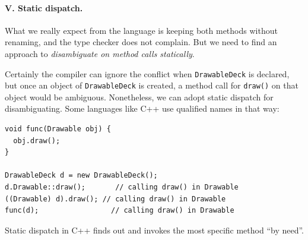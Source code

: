 \paragraph{V. Static dispatch.}
What we really expect from the language is keeping both methods
without renaming, and the type checker does not complain. 
But we need to find an approach to \emph{disambiguate on method
calls statically}.

Certainly the compiler can ignore the conflict when
\lstinline|DrawableDeck| is declared, but once an object of
\lstinline|DrawableDeck| is created, a method call for
\lstinline|draw()| on that object would be ambiguous. Nonetheless, we can adopt static dispatch for
disambiguating. Some languages like C++ use qualified names in that
way:

\vspace{3pt}\begin{lstlisting}
void func(Drawable obj) {
  obj.draw();
}

DrawableDeck d = new DrawableDeck();
d.Drawable::draw();       // calling draw() in Drawable
((Drawable) d).draw(); // calling draw() in Drawable
func(d);                 // calling draw() in Drawable
\end{lstlisting}\vspace{3pt}
Static dispatch in C++ finds out and invokes the most specific method ``by need''.

